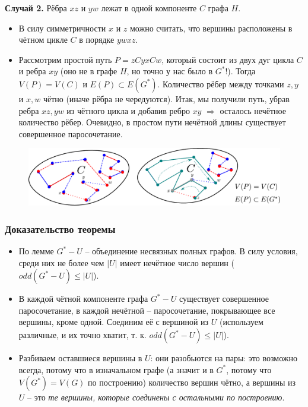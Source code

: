 \begin{frame}[t]
    \small
    \textbf{Случай 2.} Рёбра $xz$ и $yw$ лежат в одной компоненте $C$ графа $H$.

    \begin{itemize}
        \item В силу симметричности $x$ и $z$ можно считать, что
вершины расположены в чётном цикле $C$ в порядке $ywxz$.
        \item Рассмотрим простой путь $P = zCyxCw$, который состоит из двух дуг цикла  $C$ и ребра $xy$ (оно не в графе $H$, но точно у нас было в $G^*$!). Тогда  $V(P) = V(C)$ и  $E(P) \subset E(G^*)$. Количество рёбер между точками $z, y$ и $x, w$ чётно (иначе рёбра не чередуются). Итак, мы получили путь, убрав ребра $xz, yw$ из чётного цикла и добавив ребро $xy$ $ \Rightarrow $ осталось нечётное количество рёбер. Очевидно, в простом пути нечётной длины существует совершенное паросочетание. \hfill \qedsymbol
    \end{itemize}
    \begin{figure}[h]
        \centering
        \includegraphics[width=\textwidth]{images/case2_counterproof}
        \label{fig:case2_counterproof}
    \end{figure}
\end{frame}

\begin{frame}[t]
    \frametitle{Доказательство теоремы}
    \begin{itemize}
        \item По лемме $G^* -U$ -- объединение несвязных полных графов. В силу условия, среди них не более чем  $|U|$ имеет нечётное число вершин ($odd(G^* - U) \leq |U|$).
        \item В каждой чётной компоненте графа $G^* - U$ существует совершенное паросочетание, в каждой нечётной -- паросочетание, покрывающее все вершины, кроме одной. Соединим её с вершиной из $U$ (используем различные, и их точно хватит, т. к. $odd(G^* - U) \leq |U|$).
        \item Разбиваем оставшиеся вершины в $U$: они разобьются на пары: это возможно всегда, потому что в изначальном графе (а значит и в $G^*$, потому что $V(G^*) = V(G)$ по построению) количество вершин чётно, а вершины из $U$ -- это \textit{те вершины, которые соединены с остальными по построению}. \hfill \qedsymbol{}
    \end{itemize}
\end{frame}

